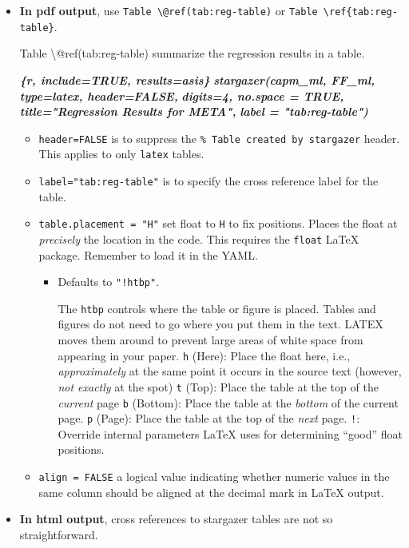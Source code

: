 \documentclass[
  a4paper,
  twoside,
  openright]{book}
\newenvironment{Shaded}{\begin{snugshade}}{\end{snugshade}}
\newcommand{\InformationTok}[1]{\textcolor[rgb]{0.56,0.35,0.01}{\textbf{\textit{#1}}}}
\newcommand{\NormalTok}[1]{#1}
\theoremstyle{definition}
\theoremstyle{definition}
\theoremstyle{definition}
\theoremstyle{definition}
\theoremstyle{remark}
\begin{document}
\begin{itemize}
\item
  \textbf{In pdf output}, use \texttt{Table\ \textbackslash{}@ref(tab:reg-table)} or \texttt{Table\ \textbackslash{}ref\{tab:reg-table\}}.

\begin{Shaded}
\begin{Highlighting}[]
\NormalTok{Table \textbackslash{}@ref(tab:reg{-}table) summarize the regression results in a table.}

\InformationTok{\textasciigrave{}\textasciigrave{}\textasciigrave{}\{r, include=TRUE, results=\textquotesingle{}asis\textquotesingle{}\}}
\InformationTok{stargazer(capm\_ml, FF\_ml, type=\textquotesingle{}latex\textquotesingle{}, header=FALSE,}
\InformationTok{          digits=4, no.space = TRUE,}
\InformationTok{          title="Regression Results for META",}
\InformationTok{          label = "tab:reg{-}table")}
\InformationTok{\textasciigrave{}\textasciigrave{}\textasciigrave{}}
\end{Highlighting}
\end{Shaded}

  \begin{itemize}
  \item
    {\texttt{header=FALSE}} is to suppress the \texttt{\%\ Table\ created\ by\ stargazer} header. This applies to only \texttt{latex} tables.
  \item
    \texttt{label="tab:reg-table"} is to specify the cross reference label for the table.
  \item
    {\texttt{table.placement\ =\ "H"}} set float to \texttt{H} to fix positions. Places the float at \emph{precisely} the location in the code. This requires the {\texttt{float}} LaTeX package. Remember to load it in the YAML.

    \begin{itemize}
    \item
      Defaults to \texttt{"!htbp"}.

      The \texttt{htbp} controls where the table or figure is placed. Tables and figures do not need to go where you put them in the text. LATEX moves them around to prevent large areas of white space from appearing in your paper.
      \texttt{h} (Here): Place the float here, i.e., \emph{approximately} at the same point it occurs in the source text (however, \emph{not exactly} at the spot)
      \texttt{t} (Top): Place the table at the top of the \emph{current} page
      \texttt{b} (Bottom): Place the table at the \emph{bottom} of the current page.
      \texttt{p} (Page): Place the table at the top of the \emph{next} page.
      \texttt{!}: Override internal parameters LaTeX uses for determining ``good'' float positions.
    \end{itemize}
  \item
    \texttt{align\ =\ FALSE} a logical value indicating whether numeric values in the same column should be aligned at the decimal mark in LaTeX output.
  \end{itemize}
\item
  \textbf{In html output}, cross references to stargazer tables are not so straightforward.


\end{itemize}
\end{document}
